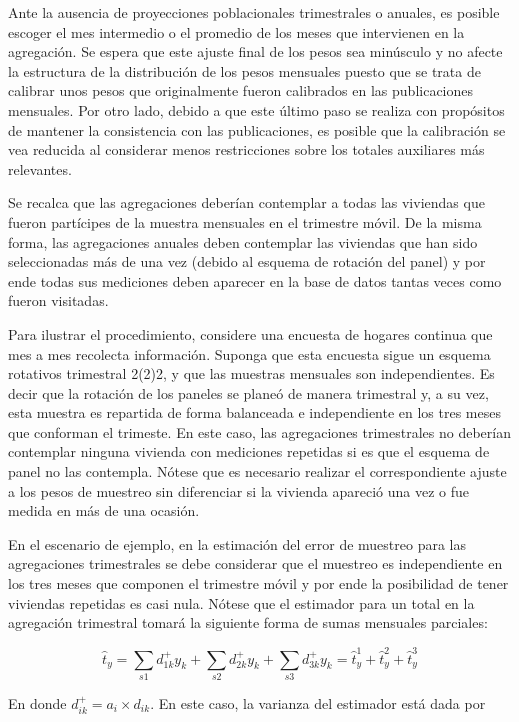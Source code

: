 \documentclass[
  12pt,
]{book}
\begin{document}
Ante la ausencia de proyecciones poblacionales trimestrales o anuales, es posible escoger el mes intermedio o el
promedio de los meses que intervienen en la agregación. Se espera que este ajuste final de los pesos
sea minúsculo y no afecte la estructura de la distribución de los pesos
mensuales puesto que se trata de calibrar unos pesos que originalmente
fueron calibrados en las publicaciones mensuales. Por otro lado, debido
a que este último paso se realiza con propósitos de mantener la
consistencia con las publicaciones, es posible que la calibración se vea
reducida al considerar menos restricciones sobre los totales auxiliares
más relevantes.

Se recalca que las agregaciones deberían contemplar a todas las
viviendas que fueron partícipes de la muestra mensuales en el trimestre
móvil. De la misma forma, las agregaciones anuales deben contemplar las
viviendas que han sido seleccionadas más de una vez (debido al esquema
de rotación del panel) y por ende todas sus mediciones deben aparecer en
la base de datos tantas veces como fueron visitadas.

Para ilustrar el procedimiento, considere una encuesta de hogares continua que mes a mes recolecta información. Suponga que esta encuesta sigue un esquema rotativos trimestral 2(2)2, y que las muestras mensuales son independientes. Es decir que la rotación de los paneles se planeó de manera trimestral y, a su vez, esta muestra es repartida de forma balanceada e independiente en los tres meses que conforman el trimeste. En este caso, las agregaciones trimestrales no deberían
contemplar ninguna vivienda con mediciones repetidas si es que el
esquema de panel no las contempla. Nótese que es necesario realizar el
correspondiente ajuste a los pesos de muestreo sin diferenciar si la
vivienda apareció una vez o fue medida en más de una ocasión.

En el escenario de ejemplo, en la estimación del error de muestreo para
las agregaciones trimestrales se debe considerar que el muestreo es
independiente en los tres meses que componen el trimestre móvil y por
ende la posibilidad de tener viviendas repetidas es casi nula. Nótese
que el estimador para un total en la agregación trimestral tomará la
siguiente forma de sumas mensuales parciales:

\[
\hat{t}_y 
= \sum_{s1} d_{1k}^+ y_k + \sum_{s2} d_{2k}^+ y_k + \sum_{s3} d_{3k}^+ y_k
= \hat{t}_{y}^1 + \hat{t}_{y}^2 + \hat{t}_{y}^3
\]

En donde \(d_{ik}^+ = a_i \times d_{ik}\). En este caso, la varianza del estimador está dada por
\end{document}
